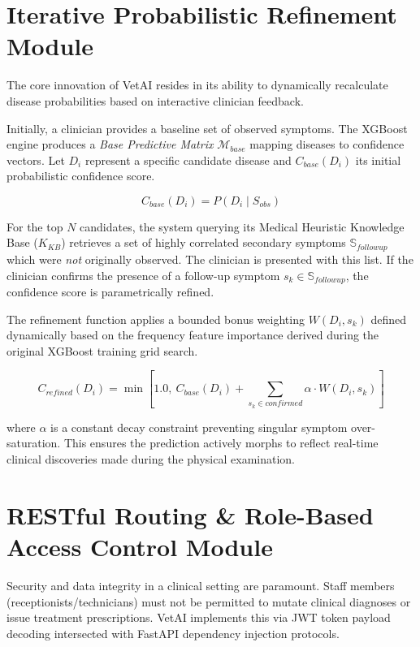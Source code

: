 \documentclass[a4paper,12pt]{report}
\begin{document}
\section{Iterative Probabilistic Refinement Module}

The core innovation of VetAI resides in its ability to dynamically recalculate disease probabilities based on interactive clinician feedback.

Initially, a clinician provides a baseline set of observed symptoms. The XGBoost engine produces a \textit{Base Predictive Matrix} $\mathcal{M}_{base}$ mapping diseases to confidence vectors. Let $D_i$ represent a specific candidate disease and $C_{base}(D_i)$ its initial probabilistic confidence score.

\begin{equation}
C_{base}(D_i) = P(D_i \mid S_{obs})
\end{equation}

For the top $N$ candidates, the system querying its Medical Heuristic Knowledge Base ($K_{KB}$) retrieves a set of highly correlated secondary symptoms $\mathbb{S}_{followup}$ which were \textit{not} originally observed. The clinician is presented with this list. If the clinician confirms the presence of a follow-up symptom $s_k \in \mathbb{S}_{followup}$, the confidence score is parametrically refined.

The refinement function applies a bounded bonus weighting $W(D_i, s_k)$ defined dynamically based on the frequency feature importance derived during the original XGBoost training grid search.

\begin{equation}
C_{refined}(D_i) = \min \left[ 1.0, \ C_{base}(D_i) + \sum_{s_k \in confirmed} \alpha \cdot W(D_i, s_k) \right]
\label{eq:refine_update}
\end{equation}

where $\alpha$ is a constant decay constraint preventing singular symptom over-saturation. This ensures the prediction actively morphs to reflect real-time clinical discoveries made during the physical examination.


\section{RESTful Routing \& Role-Based Access Control Module}

Security and data integrity in a clinical setting are paramount. Staff members (receptionists/technicians) must not be permitted to mutate clinical diagnoses or issue treatment prescriptions. VetAI implements this via JWT token payload decoding intersected with FastAPI dependency injection protocols.
\end{document}
